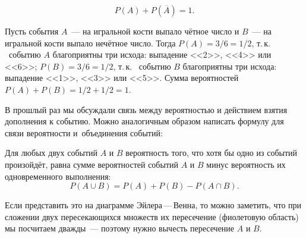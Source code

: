 \documentclass[11pt]{article}
\begin{document}
$$
P(A)+P(\overline{A})=1.
$$

\begin{examples}
   \item Пусть события $A$~--- на игральной кости выпало чётное число и $B$~--- на игральной кости выпало нечётное число. Тогда $P(A)=3/6=1/2$, т.\,к. ~событию $A$ благоприятны три исхода: выпадение <<2>>, <<4>> или <<6>>; $P(B)=3/6=1/2$, т.\,к. ~событию $B$ благоприятны три исхода: выпадение <<1>>, <<3>> или <<5>>. Сумма вероятностей $P(A)+P(B)=1/2+1/2=1$.\\

\end{examples}

В прошлый раз мы обсуждали связь между вероятностью и действием взятия дополнения к событию. Можно аналогичным образом написать формулу для связи вероятности и~объединения событий:

\begin{theorem*}
	Для любых двух событий $A$ и $B$ вероятность того, что хотя бы одно из событий произойдёт, равна сумме вероятностей событий $A$ и $B$ минус вероятность их одновременного выполнения:
	$$
	P(A\cup B)=P(A)+P(B)-P(A\cap B).
	$$
\end{theorem*}

Если представить это на диаграмме Эйлера\,---\,Венна, то можно заметить, что при сложении двух пересекающихся множеств их пересечение (фиолетовую область) мы посчитаем дважды~--- поэтому нужно вычесть пересечение $A$ и $B$.

\begin{center}
\end{center}
\end{document}
